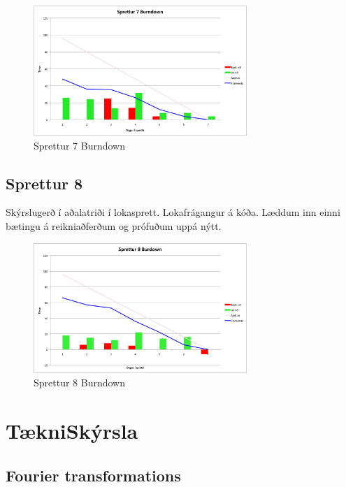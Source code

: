 \documentclass{article}
\begin{document}
\begin{figure}[H]
 \centering
 \includegraphics[width=0.72\textwidth]{Sprettur7_Burndown.png}
 \caption{Sprettur 7 Burndown}
\end{figure}

\subsection{Sprettur 8}
Skýrslugerð í aðalatriði í lokasprett. Lokafrágangur á kóða. Læddum inn einni bætingu á reikniaðferðum og prófuðum uppá nýtt.
\begin{figure}[H]
 \centering
 \includegraphics[width=0.72\textwidth]{Sprettur8_Burndown.png}
 \caption{Sprettur 8 Burndown}
\end{figure}











\section{TækniSkýrsla}


\subsection{Fourier transformations} 
\end{document}
